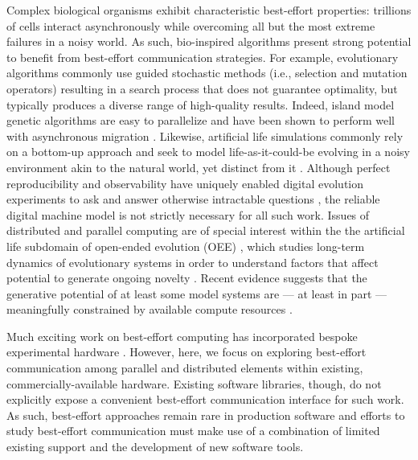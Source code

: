 Complex biological organisms exhibit characteristic best-effort properties: trillions of cells interact asynchronously while overcoming all but the most extreme failures in a noisy world.
As such, bio-inspired algorithms present strong potential to benefit from best-effort communication strategies.
For example, evolutionary algorithms commonly use guided stochastic methods (i.e., selection and mutation operators) resulting in a search process that does not guarantee optimality, but typically produces a diverse range of high-quality results.
Indeed, island model genetic algorithms are easy to parallelize and have been shown to perform well with asynchronous migration \citep{izzo2009parallel}.
Likewise, artificial life simulations commonly rely on a bottom-up approach and seek to model life-as-it-could-be evolving in a noisy environment akin to the natural world, yet distinct from it \citep{bonabeau1994we}. %
Although perfect reproducibility and observability have uniquely enabled digital evolution experiments to ask and answer otherwise intractable questions \citep{pontes2020evolutionary,lenski2003evolutionary,grabowski2013case,dolson2020interpreting,fortuna2019coevolutionary,goldsby2014evolutionary,covert2013experiments,zaman2011rapid,bundy2021footprint,dolson2017spatial}, the reliable digital machine model is not strictly necessary for all such work.
Issues of distributed and parallel computing are of special interest within the the artificial life subdomain of open-ended evolution (OEE) \citep{ackley2014indefinitely}, which studies long-term dynamics of evolutionary systems in order to understand factors that affect potential to generate ongoing novelty \citep{taylor2016open}.
Recent evidence suggests that the generative potential of at least some model systems are --- at least in part --- meaningfully constrained by available compute resources \citep{channon2019maximum}.

Much exciting work on best-effort computing has incorporated bespoke experimental hardware \citep{chippa2014scalable, ackley2011homeostatic, cho2012ersa, chakrapani2008probabilistic}.
However, here, we focus on exploring best-effort communication among parallel and distributed elements within existing, commercially-available hardware.
Existing software libraries, though, do not explicitly expose a convenient best-effort communication interface for such work.
As such, best-effort approaches remain rare in production software and efforts to study best-effort communication must make use of a combination of limited existing support and the development of new software tools.

